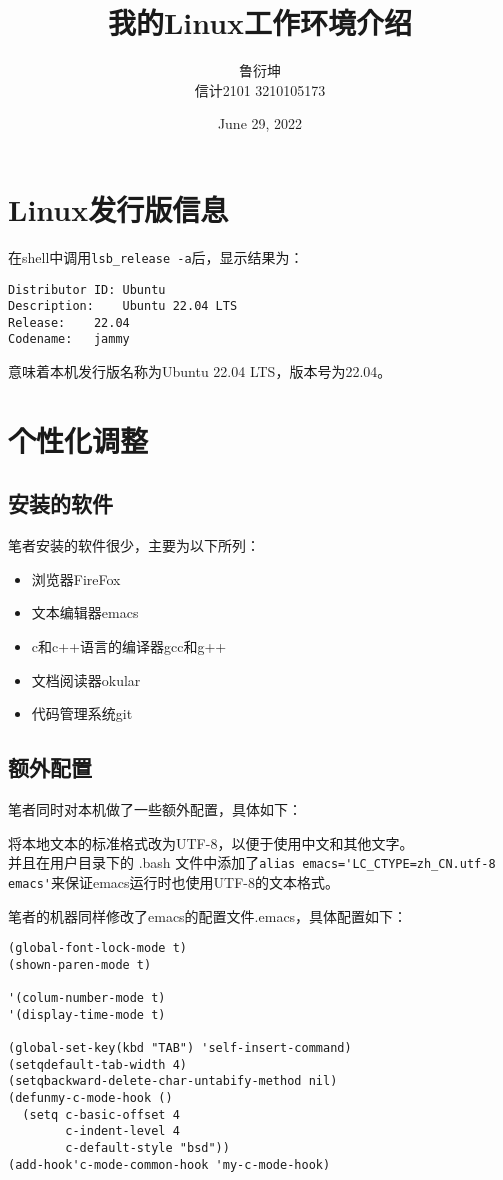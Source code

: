 \documentclass[UTF8]{article}
\title{我的Linux工作环境介绍}
\author{鲁衍坤 \\ 信计2101 3210105173}
\date{June 29, 2022}
\begin{document}
\maketitle

\section{Linux发行版信息}

在shell中调用\verb|lsb_release -a|后，显示结果为：

\begin{verbatim}
Distributor ID:	Ubuntu
Description:	Ubuntu 22.04 LTS
Release:	22.04
Codename:	jammy
\end{verbatim}

意味着本机发行版名称为Ubuntu 22.04 LTS，版本号为22.04。

\section{个性化调整}

\subsection{安装的软件}

笔者安装的软件很少，主要为以下所列：

\begin{itemize}
\item 浏览器FireFox
\item 文本编辑器emacs
\item c和c++语言的编译器gcc和g++
\item 文档阅读器okular
\item 代码管理系统git
\end{itemize}

\subsection{额外配置}

笔者同时对本机做了一些额外配置，具体如下：

将本地文本的标准格式改为UTF-8，以便于使用中文和其他文字。\\
并且在用户目录下的 .bash 文件中添加了\verb|alias emacs='LC_CTYPE=zh_CN.utf-8 emacs'|来保证emacs运行时也使用UTF-8的文本格式。

笔者的机器同样修改了emacs的配置文件.emacs，具体配置如下：

\begin{verbatim}
(global-font-lock-mode t)
(shown-paren-mode t)

'(colum-number-mode t)
'(display-time-mode t)

(global-set-key(kbd "TAB") 'self-insert-command)
(setqdefault-tab-width 4)
(setqbackward-delete-char-untabify-method nil)
(defunmy-c-mode-hook ()
  (setq c-basic-offset 4
        c-indent-level 4
        c-default-style "bsd"))
(add-hook'c-mode-common-hook 'my-c-mode-hook)
\end{verbatim}
\end{document}
